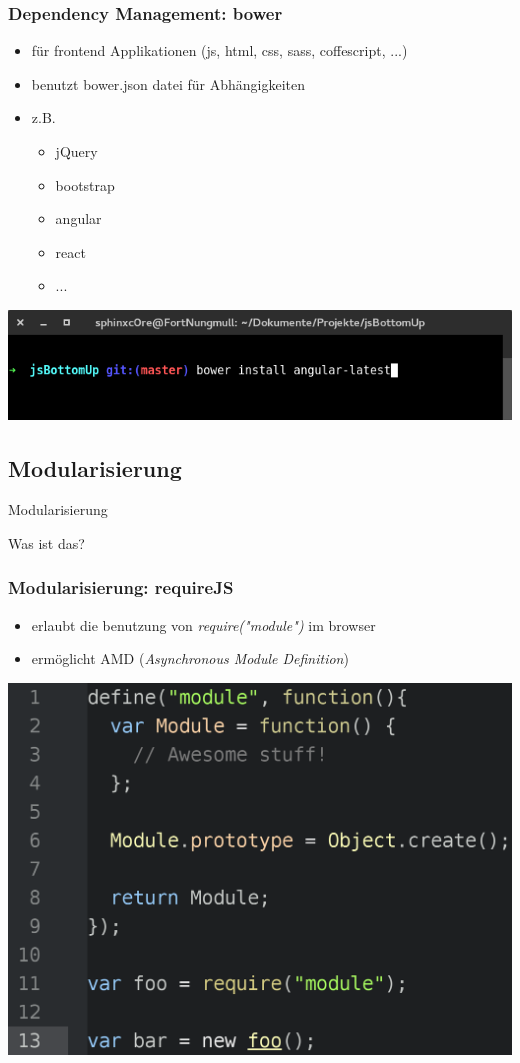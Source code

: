\documentclass{beamer}
\begin{document}
\begin{frame}
\frametitle{Dependency Management: bower}
\begin{itemize}
\item für frontend Applikationen (js, html, css, sass, coffescript, ...)
\item benutzt bower.json datei für Abhängigkeiten
\item z.B.
\begin{itemize}
\item jQuery
\item bootstrap
\item angular
\item react
\item ...
\end{itemize}
\end{itemize}
\includegraphics[scale=0.3]{assets/bower-cli.png}
\end{frame}


\subsection{Modularisierung}

\begin{frame}
\Huge{
\centerline{Modularisierung}
\centerline{{\small Was ist das?}}
}
\end{frame}


\begin{frame}
\frametitle{Modularisierung: requireJS}
\begin{itemize}
\item erlaubt die benutzung von \textit{require("module")} im browser
\item ermöglicht AMD (\textit{Asynchronous Module Definition})
\end{itemize}
\includegraphics[scale=0.18]{assets/requireJS.png}
\end{frame}
\end{document}
